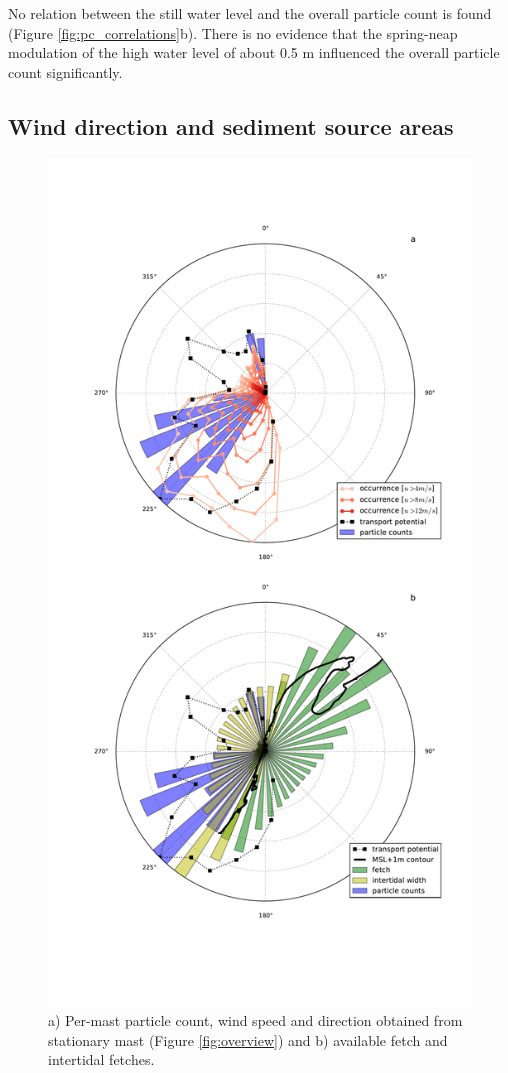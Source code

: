 No relation between the still water level and the overall particle
count is found (Figure \ref{fig:pc_correlations}b). There is no
evidence that the spring-neap modulation of the high water level of
about 0.5 m influenced the overall particle count significantly.

\subsection{Wind direction and sediment source areas}

\begin{figure}
 \centering
  \includegraphics[width=.7\columnwidth]{../Figures/polar_72096_451703}
  \caption{a) Per-mast particle count, wind speed and direction
    obtained from stationary mast (Figure \ref{fig:overview}) and b)
    available fetch and intertidal fetches.}
  \label{fig:pc_direction}
\end{figure}

